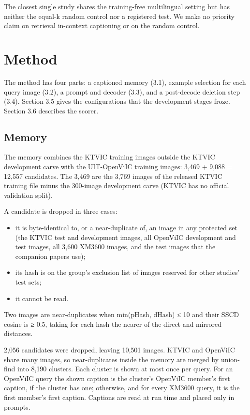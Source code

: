 The closest single study \citep{Rebelo2025RSCap} shares the training-free multilingual setting but
has neither the equal-k random control nor a registered test. We make no priority claim on retrieval
in-context captioning or on the random control.

\section{Method}\label{method}

The method has four parts: a captioned memory (3.1), example selection for each query image (3.2), a
prompt and decoder (3.3), and a post-decode deletion step (3.4). Section 3.5 gives the
configurations that the development stages froze. Section 3.6 describes the scorer.

\subsection{Memory}\label{memory}

The memory combines the KTVIC training images outside the KTVIC development carve with the
UIT-OpenViIC training images: 3,469 + 9,088 = 12,557 candidates. The 3,469 are the 3,769 images of
the released KTVIC training file minus the 300-image development carve (KTVIC has no official
validation split).

A candidate is dropped in three cases:

\begin{itemize}
\tightlist
\item
  it is byte-identical to, or a near-duplicate of, an image in any protected set (the KTVIC test and
  development images, all OpenViIC development and test images, all 3,600 XM3600 images, and the
  test images that the companion papers use);
\item
  its hash is on the group's exclusion list of images reserved for other studies' test sets;
\item
  it cannot be read.
\end{itemize}

Two images are near-duplicates when min(pHash, dHash) ≤ 10 and their SSCD \citep{Pizzi2022SSCD}
cosine is ≥ 0.5, taking for each hash the nearer of the direct and mirrored distances.

2,056 candidates were dropped, leaving 10,501 images. KTVIC and OpenViIC share many images, so
near-duplicates inside the memory are merged by union-find into 8,190 clusters. Each cluster is
shown at most once per query. For an OpenViIC query the shown caption is the cluster's OpenViIC
member's first caption, if the cluster has one; otherwise, and for every XM3600 query, it is the
first member's first caption. Captions are read at run time and placed only in prompts.

